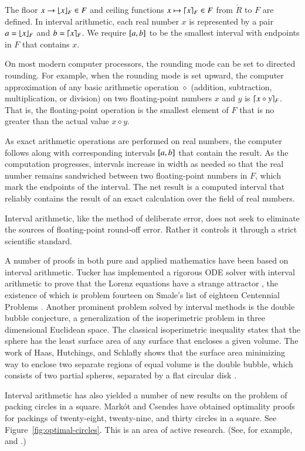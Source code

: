 The floor $x\to\lfloor x\rfloor_F\in F$ and ceiling functions
$x\mapsto\lceil x\rceil_F\in F$ from $\ring{R}$ to $F$ are defined.  In
interval arithmetic, each real number $x$ is represented by a pair
$a=\lfloor x\rfloor_F$ and $b=\lceil x\rceil_F$. We require $[
a,b]$ to be the smallest interval with endpoints in $F$
that contains $x$.

On most modern computer processors, the rounding mode can be set to
directed rounding.  For example, when the rounding mode is set upward,
the computer approximation of any basic arithmetic operation
$\diamond$ (addition, subtraction, multiplication, or division) on two
floating-point numbers $x$ and $y$ is $\lceil x\diamond y\rceil_F$.  That
is, the floating-point operation is the smallest element of $F$ that
is no greater than the actual value $x\diamond y$.

As exact arithmetic operations are performed on real numbers, the
computer follows along with corresponding intervals $[
a,b]$ that contain the result.  As the computation
progresses, intervals increase in width as needed so that the real
number remains sandwiched between two floating-point numbers in $F$,
which mark the endpoints of the interval.  The net result is a
computed interval that reliably contains the result of an exact
calculation over the field of real numbers.

Interval arithmetic, like the method of deliberate error, does not
seek to eliminate the sources of floating-point round-off error.
Rather it controls it through a strict scientific standard.


A number of proofs in both pure and applied mathematics have been
based on interval arithmetic.  Tucker has implemented a rigorous ODE
solver with interval arithmetic to prove that the Lorenz equations
have a strange attractor \cite{Tuc02}, the existence of which is
problem fourteen on Smale's list of eighteen Centennial Problems
\cite{Sma98}.  Another prominent problem solved by interval methods is
the double bubble conjecture, a generalization of the isoperimetric
problem in three dimensional Euclidean space.  The classical
isoperimetric inequality states that the sphere has the least surface
area of any surface that encloses a given volume.  The work of Haas,
Hutchings, and Schlafly shows that the surface area minimizing way to
enclose two separate regions of equal volume is the double bubble,
which consists of two partial spheres, separated by a flat circular
disk \cite{HHS95}.

Interval arithmetic has also yielded a number of new results on the
problem of packing circles in a square.  Mark\'ot and Csendes have
obtained optimality proofs for packings of twenty-eight, twenty-nine,
and thirty circles in a square.  See Figure~\ref{fig:optimal-circles}.
This is an area of active research. (See, for example, \cite{Sza07}
and \cite{Mark07}.)


